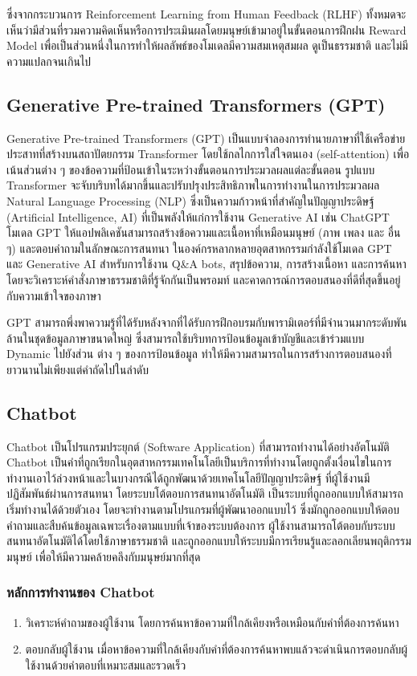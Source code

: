 \documentclass[12pt,oneside,openright,a4paper]{cpe-thai-project}
\begin{document}
ซึ่งจากกระบวนการ Reinforcement Learning from Human Feedback (RLHF) ทั้งหมดจะเห็นว่ามีส่วนที่รวมความคิดเห็นหรือการประเมินผลโดยมนุษย์เข้ามาอยู่ในขั้นตอนการฝึกฝน Reward Model เพื่อเป็นส่วนหนึ่งในการทำให้ผลลัพธ์ของโมเดลมีความสมเหตุสมผล ดูเป็นธรรมชาติ และไม่มีความแปลกจนเกินไป \newpage
\subsection{Generative Pre-trained Transformers (GPT)}
Generative Pre-trained Transformers (GPT) \cite{gpt} เป็นแบบจำลองการทำนายภาษาที่ใช้เครือข่ายประสาทที่สร้างบนสถาปัตยกรรม Transformer โดยใช้กลไกการใส่ใจตนเอง (self-attention) เพื่อเน้นส่วนต่าง ๆ ของข้อความที่ป้อนเข้าในระหว่างขั้นตอนการประมวลผลแต่ละขั้นตอน รูปแบบ Transformer จะจับบริบทได้มากขึ้นและปรับปรุงประสิทธิภาพในการทำงานในการประมวลผล Natural Language Processing (NLP) ซึ่งเป็นความก้าวหน้าที่สำคัญในปัญญาประดิษฐ์ (Artificial Intelligence, AI) ที่เป็นพลังให้แก่การใช้งาน Generative AI เช่น ChatGPT โมเดล GPT ให้แอปพลิเคชันสามารถสร้างข้อความและเนื้อหาที่เหมือนมนุษย์ (ภาพ เพลง และ
อื่น ๆ) และตอบคำถามในลักษณะการสนทนา ในองค์กรหลากหลายอุตสาหกรรมกำลังใช้โมเดล GPT และ Generative AI สำหรับการใช้งาน Q\&A bots, สรุปข้อความ, การสร้างเนื้อหา และการค้นหา โดยจะวิเคราะห์คำสั่งภาษาธรรมชาติที่รู้จักกันเป็นพรอมท์ และคาดการณ์การตอบสนองที่ดีที่สุดขึ้นอยู่กับความเข้าใจของภาษา

GPT สามารถพึ่งพาความรู้ที่ได้รับหลังจากที่ได้รับการฝึกอบรมกับพารามิเตอร์ที่มีจำนวนมากระดับพันล้านในชุดข้อมูลภาษาขนาดใหญ่ ซึ่งสามารถใช้บริบทการป้อนข้อมูลเข้าบัญชีและเข้าร่วมแบบ Dynamic ไปยังส่วน
ต่าง ๆ ของการป้อนข้อมูล ทำให้มีความสามารถในการสร้างการตอบสนองที่ยาวนานไม่เพียงแต่คำถัดไปในลำดับ
\subsection{Chatbot}
Chatbot \cite{chatbot, aibased} เป็นโปรแกรมประยุกต์ (Software Application) ที่สามารถทำงานได้อย่างอัตโนมัติ Chatbot เป็นคำที่ถูกเรียกในอุตสาหกรรมเทคโนโลยีเป็นบริการที่ทำงานโดยถูกตั้งเงื่อนไขในการทำงานเอาไว้ล่วงหน้าและในบางกรณีได้ถูกพัฒนาด้วยเทคโนโลยีปัญญาประดิษฐ์ ที่ผู้ใช้งานมีปฏิสัมพันธ์ผ่านการสนทนา โดยระบบโต้ตอบการสนทนาอัตโนมัติ เป็นระบบที่ถูกออกแบบให้สามารถเริ่มทำงานได้ด้วยตัวเอง โดยจะทำงานตามโปรแกรมที่ผู้พัฒนาออกแบบไว้ ซึ่งมักถูกออกแบบให้ตอบคำถามและสืบค้นข้อมูลเฉพาะเรื่องตามแบบที่เจ้าของระบบต้องการ ผู้ใช้งานสามารถโต้ตอบกับระบบสนทนาอัตโนมัติได้โดยใช้ภาษาธรรมชาติ และถูกออกแบบให้ระบบมีการเรียนรู้และลอกเลียนพฤติกรรมมนุษย์ เพื่อให้มีความคล้ายคลึงกับมนุษย์มากที่สุด
\subsubsection{หลักการทำงานของ Chatbot}
\begin{enumerate}
\item วิเคราะห์คำถามของผู้ใช้งาน โดยการค้นหาข้อความที่ใกล้เคียงหรือเหมือนกับคำที่ต้องการค้นหา
\item ตอบกลับผู้ใช้งาน เมื่อหาข้อความที่ใกล้เคียงกับคำที่ต้องการค้นหาพบแล้วจะดำเนินการตอบกลับผู้ใช้งานด้วยคำตอบที่เหมาะสมและรวดเร็ว
\end{enumerate}
\end{document}
